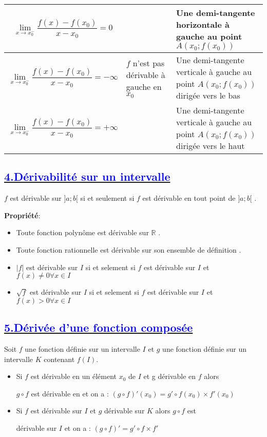 \documentclass{article}
\begin{document}
\begin{table}[H]
\begin{tabular}{|>{\centering\arraybackslash}m{5cm}|>{\centering\arraybackslash}m{3cm}|>{\centering\arraybackslash}m{6cm}|}
\cline{1-1} \cline{3-3}
\[\lim_{x \to x_0^-} \frac{f(x) - f(x_0)}{x - x_0} = 0 \] &  & Une demi-tangente horizontale à gauche au point \( A \left(x_0; f(x_0)\right) \) \\
\hline
\[\lim_{x \to x_0^-} \frac{f(x) - f(x_0)}{x - x_0} = -\infty \] & \(f\) n'est pas dérivable à gauche en \(x_0\) & Une demi-tangente verticale à gauche au point \( A \left(x_0; f(x_0)\right) \) dirigée vers le bas \\
\cline{1-1} \cline{3-3}
\[\lim_{x \to x_0^-} \frac{f(x) - f(x_0)}{x - x_0} = +\infty \] &  & Une demi-tangente verticale à gauche au point \( A \left(x_0; f(x_0)\right) \) dirigée vers le haut \\
\hline
\end{tabular}
\end{table}
\subsection*{\underline{\textbf{\textcolor{blue}{4.Dérivabilité sur un intervalle }}}}
\( f \) est dérivable sur \( ]a ; b[ \) si et seulement si \( f \) est dérivable en tout point
de \( ]a ; b[ \) .

\textbf{Propriété}:
\begin{itemize}
\item Toute fonction polynôme est dérivable sur \( \mathbb{R} \) .
\item Toute fonction rationnelle est dérivable sur son ensemble de définition .
\item \(|f|\) est dérivable sur \( I \) si et selement si \( f \) est dérivable sur \( I \) et \( f(x)  \neq 0 \forall x \in  I \)
\item \(\sqrt{f}\) est dérivable sur \( I \) si et selement si \( f \) est dérivable sur \( I \) et \( f(x) >0 \forall x \in I \)
\end{itemize}
\subsection*{\underline{\textbf{\textcolor{blue}{5.Dérivée d’une fonction composée}}}}

Soit \( f \) une fonction définie sur un intervalle \( I \) et \( g \) une fonction définie sur un intervalle \( K \) contenant \( f(I) \).

\begin{itemize}
\item Si \( f \) est dérivable en un élément \( x_{0} \) de \( I \) et g dérivable en \( f \) alors 

\( g\circ f \) est dérivable en et on a : \( (g\circ f)'(x_{0}) = g' \circ f(x_{0}) \times  f'(x_{0}) \) 

\item Si \( f \) est dérivable sur \( I \) et \( g \) dérivable sur \( K \) alors \( g\circ f \) est

dérivable sur \( I \) et on a : \( (g\circ f)' = g' \circ f \times  f' \)

\end{itemize}
\end{document}
